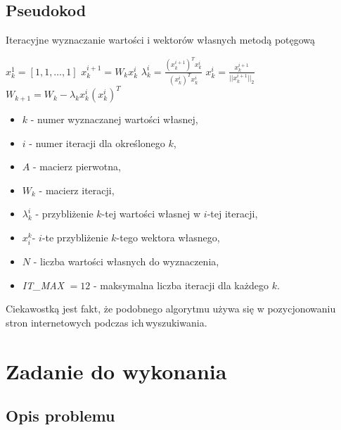 \subsection{Pseudokod}

\begin{minipage}{0.5\textwidth}
	\begin{algorithm}[H]
		\centering
		\caption{Iteracyjne wyznaczanie wartości i wektorów własnych metodą potęgową}
		\label{metoda}
		\begin{algorithmic}[1]
		\State$x^1_k = \left[1,1,\dots,1\right] $
		\State$x_k^{i+1} = W_k x_k^i$
		\State$\lambda_k^i = \frac{(x_k^{i+1})^T x^i_k}{(x^i_k)^T x^i_k}$ 
		\State$x^i_k = \frac{x^{i+1}_k}{||x^{i+1}_k||_2}$
		\EndFor
		\State$W_{k+1} = W_k - \lambda_kx^i_k(x_k^i)^T $
		\EndFor
		\end{algorithmic}
	\end{algorithm}
\end{minipage}%
\hfill 
\begin{minipage}{0.49\textwidth}
	\begin{itemize}
		\item $ k $ - numer wyznaczanej wartości własnej,
		\item $ i $ - numer iteracji dla określonego $ k $,
		\item $ A $ - macierz pierwotna,
		\item $ W_k $ - macierz iteracji, 
		\item $ \lambda^i_k $ - przybliżenie $ k$-tej wartości własnej w $ i$-tej iteracji,
		\item $ x_i^k $- $ i$-te przybliżenie $ k$-tego wektora własnego,
		\item $ N $ - liczba wartości własnych do wyznaczenia,
		\item \textit{IT\_MAX }$ = 12 $ - maksymalna liczba iteracji dla każdego $ k $.
	\end{itemize}
\end{minipage}
Ciekawostką jest fakt, że podobnego algorytmu używa się w pozycjonowaniu stron internetowych podczas ich\,wyszukiwania.

\section{Zadanie do wykonania}

\subsection{Opis problemu}

